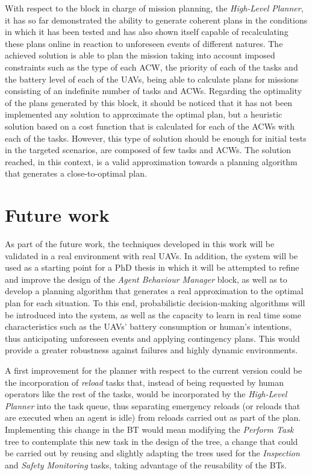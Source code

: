 With respect to the block in charge of mission planning, the \emph{High-Level Planner}, it has so far demonstrated the ability to generate coherent plans in the conditions in which it has been tested and has also shown itself capable of recalculating these plans online in reaction to unforeseen events of different natures. The achieved solution is able to plan the mission taking into account imposed constraints such as the type of each \gls{ACW}, the priority of each of the tasks and the battery level of each of the \glspl{UAV}, being able to calculate plans for missions consisting of an indefinite number of tasks and \glspl{ACW}. Regarding the optimality of the plans generated by this block, it should be noticed that it has not been implemented any solution to approximate the optimal plan, but a heuristic solution based on a cost function that is calculated for each of the \glspl{ACW} with each of the tasks. However, this type of solution should be enough for initial tests in the targeted scenarios, are composed of few tasks and \glspl{ACW}. The solution reached, in this context, is a valid approximation towards a planning algorithm that generates a close-to-optimal plan.

\section{Future work}
\label{sec:FutureWork}
As part of the future work, the techniques developed in this work will be validated in a real environment with real \glspl{UAV}. In addition, the system will be used as a starting point for a PhD thesis in which it will be attempted to refine and improve the design of the \emph{Agent Behaviour Manager} block, as well as to develop a planning algorithm that generates a real approximation to the optimal plan for each situation. To this end, probabilistic decision-making algorithms will be introduced into the system, as well as the capacity to learn in real time some characteristics such as the \glspl{UAV}' battery consumption or human's intentions, thus anticipating unforeseen events and applying contingency plans. This would provide a greater robustness against failures and highly dynamic environments.

A first improvement for the planner with respect to the current version could be the incorporation of \emph{reload} tasks that, instead of being requested by human operators like the rest of the tasks, would be incorporated by the \emph{High-Level Planner} into the task queue, thus separating emergency reloads (or reloads that are executed when an agent is idle) from reloads carried out as part of the plan. Implementing this change in the \gls{BT} would mean modifying the \emph{Perform Task} tree to contemplate this new task in the design of the tree, a change that could be carried out by reusing and slightly adapting the trees used for the \emph{Inspection} and \emph{Safety Monitoring} tasks, taking advantage of the reusability of the \glspl{BT}.

